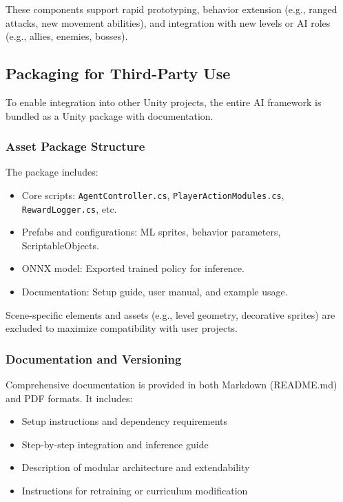 \documentclass[12pt,oneside,openright,a4paper]{cpe-english-project}
\begin{document}
These components support rapid prototyping, behavior extension (e.g., ranged attacks, new movement abilities), and integration with new levels or AI roles (e.g., allies, enemies, bosses).

\subsection{Packaging for Third-Party Use}

To enable integration into other Unity projects, the entire AI framework is bundled as a Unity package with documentation.

\subsubsection{Asset Package Structure}

The package includes:

\begin{itemize}
\item Core scripts: \texttt{AgentController.cs}, \texttt{PlayerActionModules.cs}, \texttt{RewardLogger.cs}, etc.
\item Prefabs and configurations: ML sprites, behavior parameters, ScriptableObjects.
\item ONNX model: Exported trained policy for inference.
\item Documentation: Setup guide, user manual, and example usage.
\end{itemize}

Scene-specific elements and assets (e.g., level geometry, decorative sprites) are excluded to maximize compatibility with user projects.

\subsubsection{Documentation and Versioning}

Comprehensive documentation is provided in both Markdown (README.md) and PDF formats. It includes:

\begin{itemize}
\item Setup instructions and dependency requirements
\item Step-by-step integration and inference guide
\item Description of modular architecture and extendability
\item Instructions for retraining or curriculum modification
\end{itemize}
\end{document}
